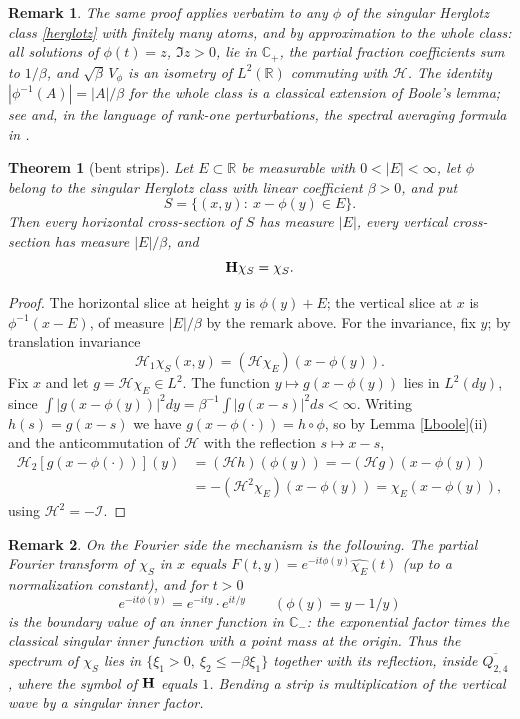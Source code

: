 \documentclass{article}
\newtheorem{theorem}{Theorem}
\newtheorem{remark}{Remark}
\def\H{{\bf H}}
\def\HH{{\mathcal H}}
\def\R{{\mathbb R}}
\def\C{{\mathbb C}}
\begin{document}
	\begin{remark}
		The same proof applies verbatim to any $\phi$ of the singular Herglotz class \eqref{herglotz} with finitely many atoms, and by approximation to the whole class: all solutions of $\phi(t)=z$, $\Im z>0$, lie in $\C_+$, the partial fraction coefficients sum to $1/\beta$, and $\sqrt\beta\, V_\phi$ is an isometry of $L^2(\R)$ commuting with $\HH$. The identity $|\phi^{-1}(A)|=|A|/\beta$ for the whole class is a classical extension of Boole's lemma; see \cite{Bo, Le} and, in the language of rank-one perturbations, the spectral averaging formula in \cite{S}.
	\end{remark}

	\begin{theorem}[bent strips]\label{Tbent}
		Let $E\subset\R$ be measurable with $0<|E|<\infty$, let $\phi$ belong to the singular Herglotz class with linear coefficient $\beta>0$, and put
		$$S=\{(x,y):\ x-\phi(y)\in E\}.$$
		Then every horizontal cross-section of $S$ has measure $|E|$, every vertical cross-section has measure $|E|/\beta$, and
		$$\H\chi_S=\chi_S.$$
	\end{theorem}

	\begin{proof}
		The horizontal slice at height $y$ is $\phi(y)+E$; the vertical slice at $x$ is $\phi^{-1}(x-E)$, of measure $|E|/\beta$ by the remark above. For the invariance, fix $y$; by translation invariance
		$$\HH_1\chi_S(x,y)=(\HH\chi_E)(x-\phi(y)).$$
		Fix $x$ and let $g=\HH\chi_E\in L^2$. The function $y\mapsto g(x-\phi(y))$ lies in $L^2(dy)$, since $\int|g(x-\phi(y))|^2dy=\beta^{-1}\int|g(x-s)|^2ds<\infty$. Writing $h(s)=g(x-s)$ we have $g(x-\phi(\cdot))=h\circ\phi$, so by Lemma \ref{Lboole}(ii) and the anticommutation of $\HH$ with the reflection $s\mapsto x-s$,
		\begin{align*}
		\HH_2\left[g(x-\phi(\cdot))\right](y)&=(\HH h)(\phi(y))=-(\HH g)(x-\phi(y))\\
		&=-(\HH^2\chi_E)(x-\phi(y))=\chi_E(x-\phi(y)),
		\end{align*}
		using $\HH^2=-\mathcal I$.
	\end{proof}

	\begin{remark}
		On the Fourier side the mechanism is the following. The partial Fourier transform of $\chi_S$ in $x$ equals $F(t,y)=e^{-it\phi(y)}\widehat{\chi_E}(t)$ (up to a normalization constant), and for $t>0$
		$$e^{-it\phi(y)}=e^{-ity}\cdot e^{it/y}\qquad(\phi(y)=y-1/y)$$
		is the boundary value of an \emph{inner function} in $\C_-$: the exponential factor times the classical singular inner function with a point mass at the origin. Thus the spectrum of $\chi_S$ lies in $\{\xi_1>0,\ \xi_2\leq -\beta\xi_1\}$ together with its reflection, inside $\overline{Q_{2,4}}$, where the symbol of $\H$ equals $1$. Bending a strip is multiplication of the vertical wave by a singular inner factor.
	\end{remark}
\end{document}
